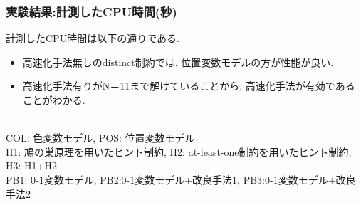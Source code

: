 \documentclass [dvipdfmx,11pt]{beamer}
\begin{document}
\begin{frame}
    \frametitle{実験結果:計測したCPU時間(秒)}
    計測したCPU時間は以下の通りである.
    \begin{block}{}
        {\tiny  }
    \end{block}
    \begin{itemize}
        \item 高速化手法無しのdistinct制約では, 位置変数モデルの方が性能が良い.
        \item 高速化手法有りがN＝11まで解けていることから, 高速化手法が有効であることがわかる.
    \end{itemize}
    \\
    \vspace{-3mm}
    {\tiny COL: 色変数モデル, POS: 位置変数モデル}\\
    \vspace{-3mm}
    {\tiny H1: 鳩の巣原理を用いたヒント制約, H2: at-least-one制約を用いたヒント制約, H3: H1+H2}\\
    \vspace{-3mm}
    {\tiny PB1: 0-1変数モデル, PB2:0-1変数モデル+改良手法1, PB3:0-1変数モデル+改良手法2}\\
\end{frame}
\end{document}
